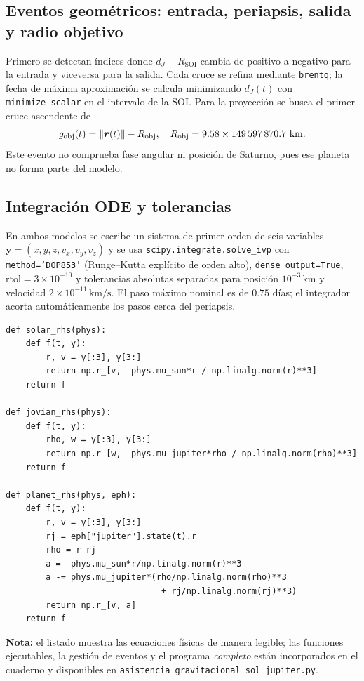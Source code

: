 \documentclass[11pt,a4paper]{article}
\newcommand{\vect}[1]{\bm{#1}}
\newcommand{\SOI}{R_{\mathrm{SOI}}}
\newcommand{\rV}{\vect r}
\begin{document}
\subsection{Eventos geométricos: entrada, periapsis, salida y radio objetivo}
Primero se detectan índices donde $d_J-\SOI$ cambia de positivo a negativo para la entrada y viceversa para la salida. Cada cruce se refina mediante \texttt{brentq}; la fecha de máxima aproximación se calcula minimizando $d_J(t)$ con \texttt{minimize\_scalar} en el intervalo de la SOI. Para la proyección se busca el primer cruce ascendente de
\begin{equation}
g_{\rm obj}(t)=\lVert\rV(t)\rVert-R_{\rm obj},\quad
R_{\rm obj}=9.58\times149\,597\,870.7\ \mathrm{km}.
\end{equation}
Este evento no comprueba fase angular ni posición de Saturno, pues ese planeta no forma parte del modelo.

\subsection{Integración ODE y tolerancias}
En ambos modelos se escribe un sistema de primer orden de seis variables $\vect y=(x,y,z,v_x,v_y,v_z)$ y se usa \texttt{scipy.integrate.solve\_ivp} con \texttt{method='DOP853'} (Runge--Kutta explícito de orden alto), \texttt{dense\_output=True}, $\mathrm{rtol}=3\times10^{-10}$ y tolerancias absolutas separadas para posición $10^{-3}\,\mathrm{km}$ y velocidad $2\times10^{-11}\,\mathrm{km/s}$. El paso máximo nominal es de $0.75$ días; el integrador acorta automáticamente los pasos cerca del periapsis.

\begin{lstlisting}[caption={Ecuaciones de propagación: código abreviado, idéntico a las fuerzas usadas.}]
def solar_rhs(phys):
    def f(t, y):
        r, v = y[:3], y[3:]
        return np.r_[v, -phys.mu_sun*r / np.linalg.norm(r)**3]
    return f

def jovian_rhs(phys):
    def f(t, y):
        rho, w = y[:3], y[3:]
        return np.r_[w, -phys.mu_jupiter*rho / np.linalg.norm(rho)**3]
    return f

def planet_rhs(phys, eph):
    def f(t, y):
        r, v = y[:3], y[3:]
        rj = eph["jupiter"].state(t).r
        rho = r-rj
        a = -phys.mu_sun*r/np.linalg.norm(r)**3
        a -= phys.mu_jupiter*(rho/np.linalg.norm(rho)**3
                               + rj/np.linalg.norm(rj)**3)
        return np.r_[v, a]
    return f
\end{lstlisting}
\textbf{Nota:} el listado muestra las ecuaciones físicas de manera legible; las funciones ejecutables, la gestión de eventos y el programa \emph{completo} están incorporados en el cuaderno y disponibles en \texttt{asistencia\_gravitacional\_sol\_jupiter.py}.
\end{document}
